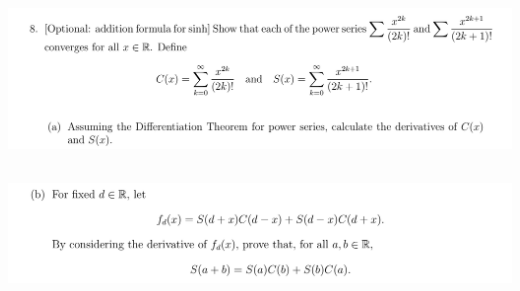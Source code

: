 \documentclass[12pt]{article}
\begin{document}
\newpage
\subsection{}
\begin{mdframed}
\includegraphics[width=400pt]{img/analysis--oxford-M2-I-7-8-a.png}
\end{mdframed}

\newpage
\subsection{}
\begin{mdframed}
\includegraphics[width=400pt]{img/analysis--oxford-M2-I-7-8-b.png}
\end{mdframed}
\end{document}

